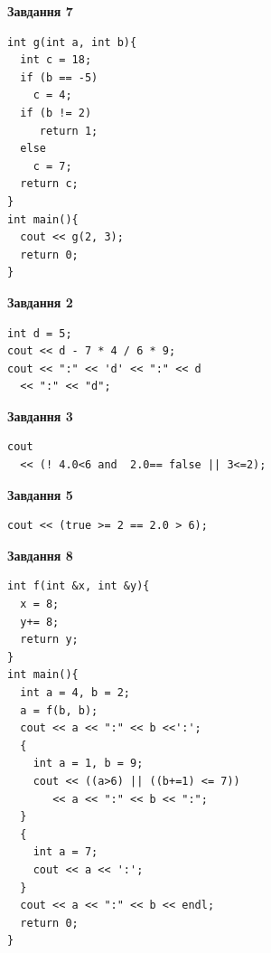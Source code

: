 \documentclass[12pt, ukrainian]{article}
\begin{document}
{\begin {large}
\begin{minipage}[t]{7.0cm}
\begin{center}
\textbf{Завдання 7}
\end{center}
\vspace{-8mm}

\begin{verbatim}
int g(int a, int b){
  int c = 18;
  if (b == -5)
    c = 4;
  if (b != 2)
     return 1;
  else
    c = 7;
  return c;
}
int main(){
  cout << g(2, 3);
  return 0;
}
\end{verbatim}

\end{minipage}
\vline \hspace{1mm}
\begin{minipage}[t]{11.0cm}

\begin{center}
\textbf{Завдання 2}
\end{center}
\vspace{-8mm}

\begin{verbatim}
int d = 5;
cout << d - 7 * 4 / 6 * 9;
cout << ":" << 'd' << ":" << d 
  << ":" << "d";
\end{verbatim}



\begin{center}
\textbf{Завдання 3}
\end{center}
\vspace{-8mm}

\begin{verbatim}
cout 
  << (! 4.0<6 and  2.0== false || 3<=2);
\end{verbatim}



\begin{center}
\textbf{Завдання 5}
\end{center}
\vspace{-8mm}

\begin{verbatim}
cout << (true >= 2 == 2.0 > 6);
\end{verbatim}



\begin{center}
\textbf{Завдання 8}
\end{center}
\vspace{-8mm}

\begin{verbatim}
int f(int &x, int &y){
  x = 8;
  y+= 8;
  return y;
}
int main(){
  int a = 4, b = 2;
  a = f(b, b);
  cout << a << ":" << b <<':';
  {
    int a = 1, b = 9;
    cout << ((a>6) || ((b+=1) <= 7))
       << a << ":" << b << ":";
  }
  {
    int a = 7;
    cout << a << ':';
  }
  cout << a << ":" << b << endl;
  return 0;
}
\end{verbatim}


\end{minipage}
\end{large}}
\end{document}
